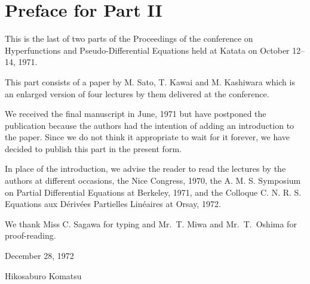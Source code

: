 \chapter*{Preface for Part II}

This is the last of two parts of the Proceedings of
the conference on Hyperfunctions and Pseudo-Differential 
Equations held at Katata on October 12--14, 1971. 

This part consists of a paper by 
M. Sato, T. Kawai and M. Kashiwara which is an enlarged 
version of four lectures by them delivered at the conference.

We received the final manuscript in June, 1971 but have
postponed the publication because the authors had the intention
of adding an introduction to the paper. 
Since we do not think it appropriate to wait for it forever, 
we have decided to publish this part in the present form. 

In place of the introduction, we advise the reader to read 
the lectures by the authors at different occasions, 
the Nice Congress, 1970, the A. M. S. Symposium on 
Partial Differential Equations at Berkeley, 1971, 
and the Colloque C. N. R. S. Equations aux 
D\'eriv\'ees Partielles Lin\'eaires at Orsay, 1972. 

We thank Miss C. Sagawa for typing and Mr.\ T. Miwa and 
Mr.\ T.\ Oshima for proof-reading. 


\begin{flushright}
    December 28, 1972
    \linebreak

    Hikosaburo Komatsu
\end{flushright}
